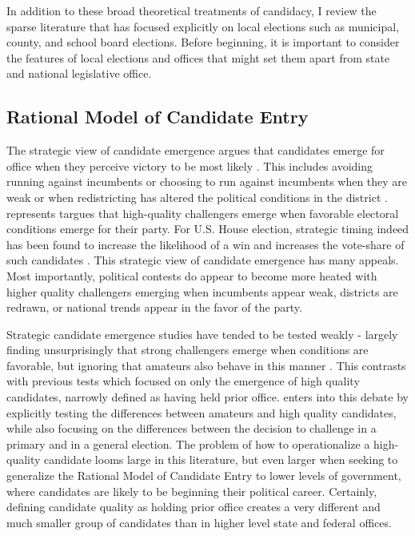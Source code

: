 In addition to these broad theoretical treatments of candidacy, I review the sparse 
literature that has focused explicitly on local elections such as municipal, county, 
and school board elections. Before beginning, it is important to consider the features 
of local elections and offices that might set them apart from state and national 
legislative office. 

\subsection{Rational Model of Candidate Entry}

The strategic view of candidate emergence argues that candidates emerge for 
office when they perceive victory to be most likely \citep{schlesinger1}. This includes avoiding 
running against incumbents or choosing to run against incumbents when they are 
weak or when redistricting has altered the political conditions in the district \citep{Black72}. 
\citet{JacobsonBook} represents targues that high-quality challengers emerge when 
favorable electoral conditions emerge for their party. For U.S. House election, 
strategic timing indeed has been found to increase the likelihood of a win 
and increases the vote-share of such candidates \citep{JacobsonStrategy}. This 
strategic view of candidate emergence has many appeals. Most importantly, political 
contests do appear to become more heated with higher quality challengers emerging 
when incumbents appear weak, districts are redrawn, or national trends appear 
in the favor of the party. 

Strategic candidate emergence studies have tended to be tested weakly - largely 
finding unsurprisingly that strong challengers emerge when conditions are favorable, 
but ignoring that amateurs also behave in this manner \citep{CanonArt, CanonBook}. 
This contrasts with previous tests which focused on only the emergence of high 
quality candidates, narrowly defined as having held prior office. \citet{Lazarus2008} 
enters into this debate by explicitly testing the differences between amateurs 
and high quality candidates, while also focusing on the differences between the 
decision to challenge in a primary and in a general election. The problem of 
how to operationalize a high-quality candidate looms large in this literature, but 
even larger when seeking to generalize the Rational Model of Candidate Entry to 
lower levels of government, where candidates are likely to be beginning their 
political career. Certainly, defining candidate quality as holding prior office 
creates a very different and much smaller group of candidates than in higher 
level state and federal offices. 

